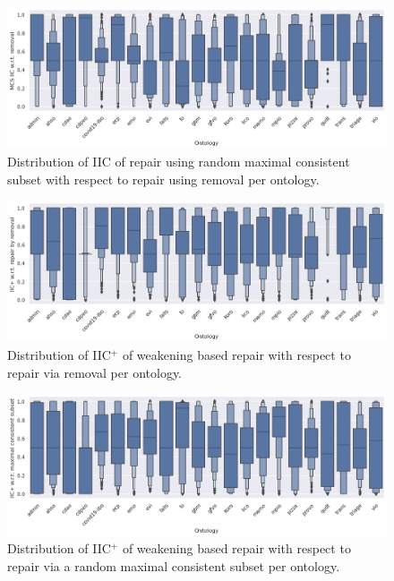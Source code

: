 \begin{figure}[htbp]
  \centering
  \includegraphics[width=\textwidth]{resources/iic-mcs-rem-ontology-violin.png}
  \caption{Distribution of IIC of repair using random maximal consistent subset with respect to repair using removal per ontology.}
\end{figure}

\begin{figure}[htbp]
  \centering
  \includegraphics[width=\textwidth]{resources/eiic-remove-ontology-violin.png}
  \caption{Distribution of IIC$^+$ of weakening based repair with respect to repair via removal per ontology.}
\end{figure}

\begin{figure}[htbp]
  \centering
  \includegraphics[width=\textwidth]{resources/eiic-mcs-ontology-violin.png}
  \caption{Distribution of IIC$^+$ of weakening based repair with respect to repair via a random maximal consistent subset per ontology.}
\end{figure}

